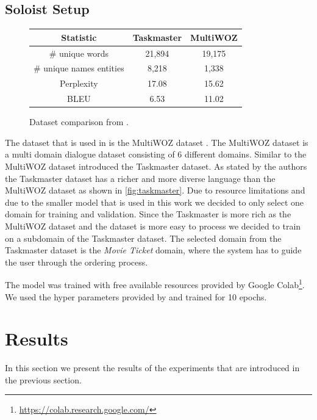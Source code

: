\documentclass[twocolumn]{tum-article}
\begin{document}
\subsection{Soloist Setup}
\begin{figure}[!h]
\centering
\begin{tabular}{c|c|c}
\hline
\textbf{Statistic} & \textbf{Taskmaster} & \textbf{MultiWOZ}\\
\hline
\# unique words & 21,894 & 19,175 \\
\hline
\# unique names entities & 8,218 & 1,338 \\
\hline
Perplexity & 17.08 & 15.62 \\
\hline
BLEU & 6.53 & 11.02\\
\hline
\end{tabular}
\caption{Dataset comparison from \cite{byrne2019taskmaster}.}
\label{fig:taskmaster}
\end{figure}
The dataset that is used in \cite{peng2020soloist} is the MultiWOZ dataset \cite{budzianowski2020multiwoz}. The MultiWOZ dataset is a multi domain dialogue dataset consisting of 6 different domains. Similar to the MultiWOZ dataset \cite{byrne2019taskmaster} introduced the Taskmaster dataset. As stated by the authors the Taskmaster dataset has a richer and more diverse language than the MultiWOZ dataset as shown in \autoref{fig:taskmaster}. Due to resource limitations and due to the smaller model that is used in this work we decided to only select one domain for training and validation. Since the Taskmaster is more rich as the MultiWOZ dataset and the dataset is more easy to process we decided to train on a subdomain of the Taskmaster dataset. The selected domain from the Taskmaster dataset is the \textit{Movie Ticket} domain, where the system has to guide the user through the ordering process. 

The model was trained with free available resources provided by Google Colab\footnote{\url{https://colab.research.google.com/}}. We used the hyper parameters provided by \cite{peng2020soloist} and trained for 10 epochs. 
\section{Results}
In this section we present the results of the experiments that are introduced in the previous section. 
\end{document}
